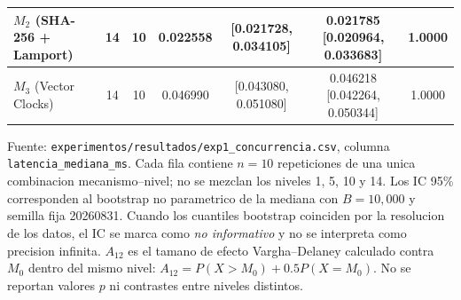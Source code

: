 \begin{table}[H]
\begin{tabular}{|l|c|c|c|c|c|c|}
\hline
$M_2$ (SHA-256 + Lamport) & 14 & 10 & 0.022558 & [0.021728, 0.034105] & 0.021785 [0.020964, 0.033683] & 1.0000 \\
\hline
$M_3$ (Vector Clocks) & 14 & 10 & 0.046990 & [0.043080, 0.051080] & 0.046218 [0.042264, 0.050344] & 1.0000 \\
\hline
\end{tabular}
\vspace{0.35em}
\begin{minipage}{0.98\columnwidth}
\footnotesize Fuente: \texttt{experimentos/resultados/exp1\_concurrencia.csv}, columna \texttt{latencia\_mediana\_ms}. Cada fila contiene $n=10$ repeticiones de una unica combinacion mecanismo--nivel; no se mezclan los niveles 1, 5, 10 y 14. Los IC 95\% corresponden al bootstrap no parametrico de la mediana con $B=10{,}000$ y semilla fija 20260831. Cuando los cuantiles bootstrap coinciden por la resolucion de los datos, el IC se marca como \emph{no informativo} y no se interpreta como precision infinita. $A_{12}$ es el tamano de efecto Vargha--Delaney calculado contra $M_0$ dentro del mismo nivel: $A_{12}=P(X>M_0)+0.5P(X=M_0)$. No se reportan valores $p$ ni contrastes entre niveles distintos.
\end{minipage}
\end{table}
